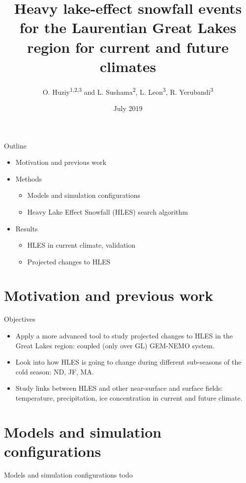 \documentclass{beamer}
\title{Heavy lake-effect snowfall events for the Laurentian Great Lakes region for current and future climates}
\date{July 2019}
\author{O. Huziy\textsuperscript{1,2,3} and L. Sushama\textsuperscript{2}, L. Leon\textsuperscript{3}, R. Yerubandi\textsuperscript{3}}
\institute{
  \textsuperscript{1}Environement and Climate Change Canada,\\
  \textsuperscript{2}McGill University,\\
  \textsuperscript{3}Université du Québec à Montréal
}
\begin{document}
  \maketitle

  \begin{frame}{Outline}
    \begin{itemize}
      \item Motivation and previous work
      \item Methods
      \begin{itemize}
        \item Models and simulation configurations
        \item Heavy Lake Effect Snowfall (HLES) search algorithm
      \end{itemize}

      \item Results
      \begin{itemize}
        \item HLES in current climate, validation
        \item Projected changes to HLES
      \end{itemize}
    \end{itemize}
  \end{frame}

  \section{Motivation and previous work}
  \begin{frame}{Objectives}
    \begin{itemize}
      \item Apply a more advanced tool to study projected changes to HLES in the Great Lakes region: coupled (only over GL) GEM-NEMO system.
      \item Look into how HLES is going to change during different sub-seasons of the cold season: ND, JF, MA.
      \item Study links between HLES and other near-surface and surface fields: temperature, precipitation, ice concentration in current and future climate.
    \end{itemize}
  \end{frame}

  \section{Models and simulation configurations}
  \begin{frame}{Models and simulation configurations}
    todo
  \end{frame}
\end{document}
